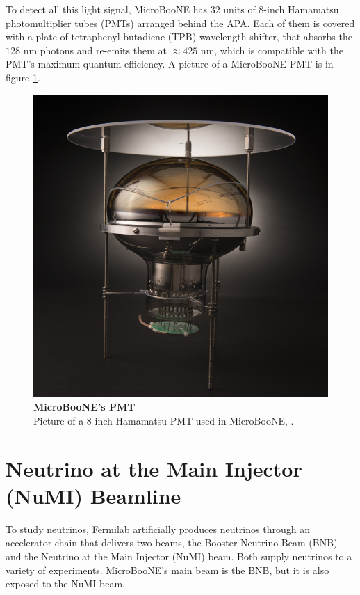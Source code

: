 To detect all this light signal, MicroBooNE has $32$ units of 8-inch Hamamatsu photomultiplier tubes (PMTs) arranged behind the APA. Each of them is covered with a plate of tetraphenyl butadiene (TPB) wavelength-shifter, that absorbs the $128$ nm photons and re-emits them at $\approx425$ nm, which is compatible with the PMT's maximum quantum efficiency. A picture of a MicroBooNE PMT is in figure \ref{uboone_pmt}.

\begin{figure}[h!]
    \begin{center}
        \includegraphics[scale=0.2]{Figures/microboone_pmt.jpeg}
        \caption[MicroBooNE's PMT]{{\textbf{MicroBooNE's PMT}} \\Picture of a $8$-inch Hamamatsu PMT used in MicroBooNE, \cite{uboone_pmt}.}
        \label{uboone_pmt} 
    \end{center}
\end{figure}

\section{Neutrino at the Main Injector (NuMI) Beamline}

To study neutrinos, Fermilab artificially produces neutrinos through an accelerator chain that delivers two beams, the Booster Neutrino Beam (BNB) and the Neutrino at the Main Injector (NuMI) beam. Both supply neutrinos to a variety of experiments. MicroBooNE's main beam is the BNB,  but it is also exposed to the NuMI beam. 


